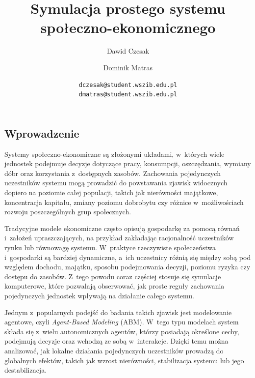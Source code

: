\documentclass[polish]{projectreport}
\author{Dawid Czesak \and Dominik Matras}
\title{Symulacja prostego systemu spo{\l}eczno-ekonomicznego}
\date{
    {\small \texttt{dczesak@student.wszib.edu.pl}\\[1ex]
    \texttt{dmatras@student.wszib.edu.pl}\\[2ex]
    \the\year}
}
\begin{document}
\maketitle

\thispagestyle{empty}

\section{\SectionTitleIntroduction}
\label{sec:introduction}

\subsection{Wprowadzenie}
\label{sec:intro}

Systemy spo\l{}eczno-ekonomiczne s\k{a} z\l{}o\.{z}onymi uk\l{}adami, w~kt\'orych wiele jednostek podejmuje
decyzje dotycz\k{a}ce pracy, konsumpcji, oszcz\k{e}dzania, wymiany d\'obr oraz korzystania
z~dost\k{e}pnych zasob\'ow. Zachowania pojedynczych uczestnik\'ow systemu mog\k{a} prowadzi\'{c} do
powstawania zjawisk widocznych dopiero na poziomie ca\l{}ej populacji, takich jak
nier\'owno\'sci maj\k{a}tkowe, koncentracja kapita\l{}u, zmiany poziomu dobrobytu czy r\'o\.{z}nice
w~mo\.{z}liwo\'sciach rozwoju poszczeg\'olnych grup spo\l{}ecznych.

Tradycyjne modele ekonomiczne cz\k{e}sto opisuj\k{a} gospodark\k{e} za pomoc\k{a} r\'owna\'n i~za\l{}o\.{z}e\'n
upraszczaj\k{a}cych, na przyk\l{}ad zak\l{}adaj\k{a}c racjonalno\'s\'{c} uczestnik\'ow rynku lub r\'ownowag\k{e}
systemu. W~praktyce rzeczywiste spo\l{}ecze\'nstwa i~gospodarki s\k{a} bardziej dynamiczne,
a~ich uczestnicy r\'o\.{z}ni\k{a} si\k{e} mi\k{e}dzy sob\k{a} pod wzgl\k{e}dem dochodu, maj\k{a}tku, sposobu
podejmowania decyzji, poziomu ryzyka czy dost\k{e}pu do zasob\'ow. Z~tego powodu coraz
cz\k{e}\'sciej stosuje si\k{e} symulacje komputerowe, kt\'ore pozwalaj\k{a} obserwowa\'{c}, jak proste
regu\l{}y zachowania pojedynczych jednostek wp\l{}ywaj\k{a} na dzia\l{}anie ca\l{}ego systemu.

Jednym z~popularnych podej\'s\'{c} do badania takich zjawisk jest modelowanie agentowe,
czyli \emph{Agent-Based Modeling} (ABM). W~tego typu modelach system sk\l{}ada si\k{e}
z~wielu autonomicznych agent\'ow, kt\'orzy posiadaj\k{a} okre\'slone cechy, podejmuj\k{a} decyzje
oraz wchodz\k{a} ze sob\k{a} w~interakcje. Dzi\k{e}ki temu mo\.{z}na analizowa\'{c}, jak lokalne dzia\l{}ania
pojedynczych uczestnik\'ow prowadz\k{a} do globalnych efekt\'ow, takich jak wzrost nier\'owno\'sci,
stabilizacja systemu lub jego destabilizacja.
\end{document}
